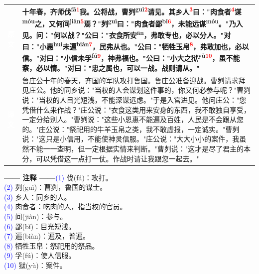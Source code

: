 \documentclass[a4paper,12pt]{ctexart}
\makeatletter
\newcommand{\ruby}[2]{#1\textsuperscript{#2}}
\newlength{\colA}\setlength{\colA}{0.06\textwidth}
\newlength{\colB}\setlength{\colB}{0.64\textwidth}
\newlength{\colC}\setlength{\colC}{0.26\textwidth}
\newcommand{\sectab}[3]{%
  \noindent
  \begin{minipage}[c]{\dimexpr\colA+\colB+2\tabcolsep\relax}
  \begin{tabular}{@{}p{\colA}p{\colB}@{}}
  \sideyuan  & {\large\bfseries #1} \\
  \sideyiwen & {\large #2} \\
  \end{tabular}
  \end{minipage}
  \hfill
  \begin{minipage}[c]{\colC}
  {\labelann\vspace{0.1cm}}#3
  \end{minipage}
  \par
}
\newcommand{\sideyuan}{\colorbox{blue!70!black}{\textcolor{white}{\normalsize\textbf{原文}}}}
\newcommand{\sideyiwen}{\colorbox{green!60!black}{\textcolor{white}{\normalsize\textbf{译文}}}}
\newcommand{\labelann}{\textcolor{orange!80!black}{\small\textbf{—— 注释 ——}}}
\newcommand{\refmark}[1]{\textsuperscript{\textcolor{red}{#1}}}
\makeatother
\begin{document}
\vspace{0.3cm}
\sectab{十年春，齐师\ruby{伐}{fá}\refmark{1}我。公将战，曹\ruby{刿}{guì}\refmark{2}请见。其乡人\refmark{3}曰："肉食者\refmark{4}\ruby{谋}{móu}之，又何\ruby{间}{jiàn}\refmark{5}焉？"\ruby{刿}{guì}曰："肉食者\ruby{鄙}{bǐ}\refmark{6}，未能远\ruby{谋}{móu}。"乃入见。问："何以战？"公曰："衣食所\ruby{安}{ān}，弗敢专也，必以分人。"对曰："小\ruby{惠}{huì}未\ruby{遍}{biàn}\refmark{7}，民弗从也。"公曰："牺牲玉帛\refmark{8}，弗敢加也，必以信。"对曰："小信未\ruby{孚}{fú}\refmark{9}，神弗福也。"公曰："小大之\ruby{狱}{yù}\refmark{10}，虽不能察，必以情。"对曰："忠之属也，可以一战。战则请从。"}{鲁庄公十年的春天，齐国的军队攻打鲁国。鲁庄公准备迎战。曹刿请求拜见庄公。他的同乡说："当权的人会谋划这件事的，你又何必参与呢？"曹刿说："当权的人目光短浅，不能深谋远虑。"于是入宫进见。他问庄公："您凭借什么来作战？"庄公说："衣食这类用来安身的东西，我不敢独自享受，一定分给别人。"曹刿说："这些小恩惠不能遍及百姓，人民是不会跟从您的。"庄公说："祭祀用的牛羊玉帛之类，我不敢虚报，一定诚实。"曹刿说："这只是小信用，不能使神灵信服。"庄公说："大大小小的案件，我虽然不能一一查明，但一定根据实情来判断。"曹刿说："这才是尽了君主的本分，可以凭借这一点打一仗。作战时请让我跟您一起去。"}{{\small \textcolor{blue}{(1)} 伐(fá)：攻打。}\\[0.1cm]{\small \textcolor{blue}{(2)} 刿(guì)：曹刿，鲁国的谋士。}\\[0.1cm]{\small \textcolor{blue}{(3)} 乡人：同乡的人。}\\[0.1cm]{\small \textcolor{blue}{(4)} 肉食者：吃肉的人，指当权的官员。}\\[0.1cm]{\small \textcolor{blue}{(5)} 间(jiàn)：参与。}\\[0.1cm]{\small \textcolor{blue}{(6)} 鄙(bǐ)：目光短浅。}\\[0.1cm]{\small \textcolor{blue}{(7)} 遍(biàn)：遍及，普遍。}\\[0.1cm]{\small \textcolor{blue}{(8)} 牺牲玉帛：祭祀用的祭品。}\\[0.1cm]{\small \textcolor{blue}{(9)} 孚(fú)：使人信服。}\\[0.1cm]{\small \textcolor{blue}{(10)} 狱(yù)：案件。}}
\end{document}

